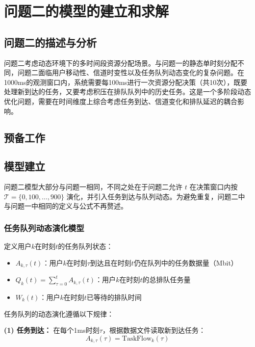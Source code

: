 \section{问题二的模型的建立和求解}
\subsection{问题二的描述与分析}

问题二考虑动态环境下的多时间段资源分配场景。与问题一的静态单时刻分配不同，问题二面临用户移动性、信道时变性以及任务队列动态变化的复杂问题。在1000ms的观测窗口内，系统需要每100ms进行一次资源分配决策（共10次），既要处理新到达的任务，又要考虑积压在排队队列中的历史任务。这是一个多阶段动态优化问题，需要在时间维度上综合考虑任务到达、信道变化和排队延迟的耦合影响。

\subsection{预备工作}

\subsection{模型建立}

问题二模型大部分与问题一相同，不同之处在于问题二允许 $t$ 在决策窗口内按 $\mathcal{T}=\{0,100,\dots,900\}$ 演化，并引入任务到达与队列动态。为避免重复，问题二中与问题一中相同的定义与公式不再赘述。

\subsubsection{任务队列动态演化模型}

定义用户$k$在时刻$t$的任务队列状态：

\begin{itemize}
  \item $A_{k,\tau}(t)$：用户$k$在时刻$\tau$到达且在时刻$t$仍在队列中的任务数据量（Mbit）
  \item $Q_k(t) = \sum_{\tau=0}^{t} A_{k,\tau}(t)$：用户$k$在时刻$t$的总排队任务量
  \item $W_k(t)$：用户$k$在时刻$t$已等待的排队时间
\end{itemize}

任务队列的动态演化遵循以下规律：

\textbf{(1) 任务到达：}
在每个1ms时刻$\tau$，根据数据文件读取新到达任务：
\begin{equation}
A_{k,\tau}(\tau) = \text{TaskFlow}_k(\tau)
\end{equation}

